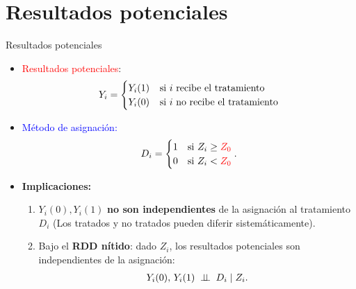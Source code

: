 \documentclass[10pt, xcolor=dvipsnames]{beamer}
\begin{document}
\section{Resultados potenciales}

\begin{frame}{Resultados potenciales}
    \begin{itemize}
    \item \textcolor{red}{Resultados potenciales}:
    \vspace{-0.75em}
    \begin{align*}
    Y_i = 
    \begin{cases}
        Y_i(1) &\hspace{0.5pt} \text{si $i$ recibe el tratamiento}\\
        Y_i(0) &\hspace{0.5pt} \text{si $i$ no recibe el tratamiento}
    \end{cases}
    \end{align*}
    \item \textcolor{blue}{Método de asignación:}
    \vspace{-1em}
    \begin{align*}
        D_i = 
    \begin{cases}
        1 & \text{si } Z_i \geq \textcolor{red}{Z_0}\\
        0 & \text{si } Z_i < \textcolor{red}{Z_0} 	
    \end{cases}.
    \end{align*}
    \item \textbf{Implicaciones:} \smallspace
        \begin{enumerate}
        \item $Y_i(0), Y_i(1)$ \textbf{no son independientes} de la asignación al tratamiento $D_i$ (Los tratados y no tratados pueden diferir sistemáticamente). \smallspace %
        \item Bajo el \textbf{RDD nítido}: dado $Z_i$, los resultados potenciales son independientes de la asignación:  
        \begin{align*}
            Y_i(0),\, Y_i(1) \;\perp \!\!\! \perp\; D_i \mid Z_i.        
        \end{align*}
        \end{enumerate}
    \end{itemize}
\end{frame}
\end{document}
